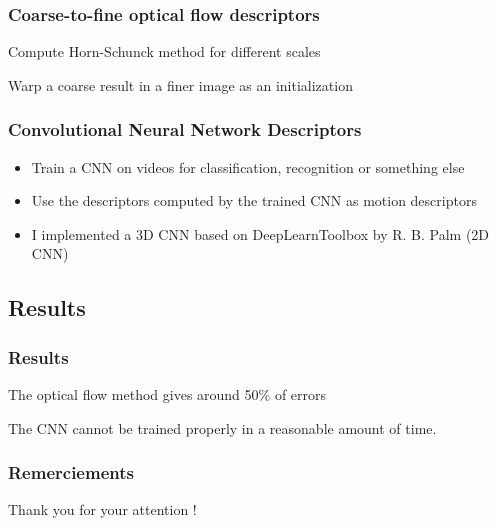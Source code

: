 \documentclass[french]{beamer}
\begin{document}
	\begin{frame}
		\frametitle{Coarse-to-fine optical flow descriptors}
		
			Compute Horn-Schunck method for different scales
			\newline
			
			Warp a coarse result in a finer image as an initialization
		
	\end{frame}
	
	
	\begin{frame}
		\frametitle{Convolutional Neural Network Descriptors}
		
		\begin{itemize}
			\item Train a CNN on videos for classification, recognition or something else
		\item Use the descriptors computed by the trained CNN as motion descriptors
		\item I implemented a 3D CNN based on DeepLearnToolbox by R. B. Palm (2D CNN)
		\end{itemize}
	\end{frame}
	
	
	\begin{frame}
		\section{Results}
		\frametitle{Results}
		
			The optical flow method gives around 50\% of errors
			\newline
			
			The CNN cannot be trained properly in a reasonable amount of time.
		
	\end{frame}
	
	\begin{frame}
	\frametitle{Remerciements}
	
	Thank you for your attention !
	
	\end{frame}
\end{document}
